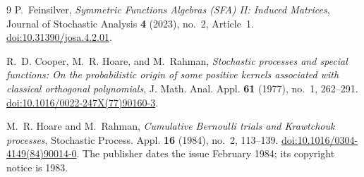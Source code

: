 \documentclass[11pt,reqno]{amsart}
\begin{document}
\begin{thebibliography}{9}
P.~Feinsilver, \emph{Symmetric Functions Algebras (SFA) II: Induced
Matrices}, Journal of Stochastic Analysis \textbf{4} (2023), no.~2,
Article~1.
\href{https://doi.org/10.31390/josa.4.2.01}{doi:10.31390/josa.4.2.01}.

R.~D. Cooper, M.~R. Hoare, and M.~Rahman,
\emph{Stochastic processes and special functions: On the probabilistic
origin of some positive kernels associated with classical orthogonal
polynomials}, J. Math. Anal. Appl. \textbf{61} (1977), no.~1, 262--291.
\href{https://doi.org/10.1016/0022-247X(77)90160-3}{doi:10.1016/0022-247X(77)90160-3}.

M.~R. Hoare and M.~Rahman, \emph{Cumulative Bernoulli trials and
Krawtchouk processes}, Stochastic Process. Appl. \textbf{16} (1984),
no.~2, 113--139.
\href{https://doi.org/10.1016/0304-4149(84)90014-0}{doi:10.1016/0304-4149(84)90014-0}.
The publisher dates the issue February 1984; its copyright notice is 1983.

\end{thebibliography}
\end{document}
